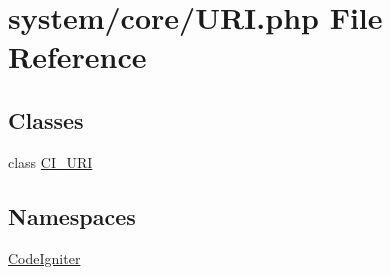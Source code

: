 \hypertarget{_u_r_i_8php}{}\section{system/core/\+U\+RI.php File Reference}
\label{_u_r_i_8php}
\subsection*{Classes}
\begin{DoxyCompactItemize}
\item 
class \mbox{\hyperlink{class_c_i___u_r_i}{C\+I\+\_\+\+U\+RI}}
\end{DoxyCompactItemize}
\subsection*{Namespaces}
\begin{DoxyCompactItemize}
\item 
 \mbox{\hyperlink{namespace_code_igniter}{Code\+Igniter}}
\end{DoxyCompactItemize}
